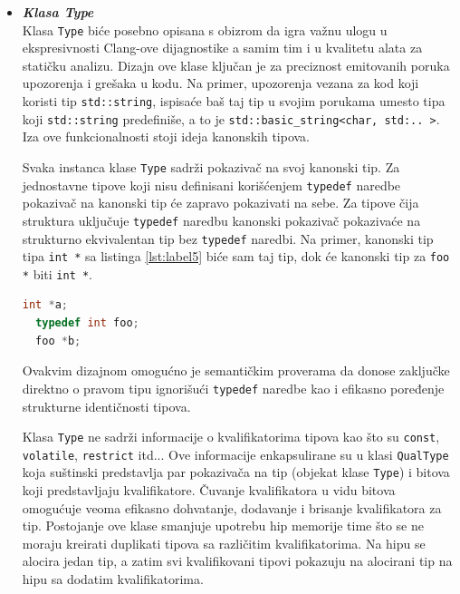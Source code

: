 \documentclass[12pt,oneside]{memoir}
\begin{document}
\begin{itemize}
  \item \textit{\textbf{Klasa Type}} \\ Klasa \lstinline{Type} bi\'{c}e posebno opisana s obizrom da igra va\v{z}nu ulogu u ekspresivnosti Clang-ove dijagnostike a samim tim i u kvalitetu alata za stati\v{c}ku analizu. Dizajn ove klase klju\v{c}an je za preciznost emitovanih poruka upozorenja i gre\v{s}aka u kodu. Na primer, upozorenja vezana za kod koji koristi tip \lstinline{std::string}, ispisa\'{c}e ba\v{s} taj tip u svojim porukama umesto tipa koji \lstinline{std::string} predefini\v{s}e, a to je \lstinline{std::basic_string<char, std:.. >}. Iza ove funkcionalnosti stoji ideja kanonskih tipova.
  
  \par
  Svaka instanca klase \lstinline{Type} sadr\v{z}i pokaziva\v{c} na svoj kanonski tip. Za jednostavne tipove koji nisu definisani kori\v{s}\'{c}enjem \lstinline{typedef} naredbe pokaziva\v{c} na kanonski tip \'{c}e zapravo pokazivati na sebe. Za tipove \v{c}ija struktura uklju\v{c}uje \lstinline{typedef} naredbu kanonski pokaziva\v{c} pokaziva\'{c}e na strukturno ekvivalentan tip bez \lstinline{typedef} naredbi.
  Na primer, kanonski tip tipa \lstinline{int *} sa listinga \ref{lst:label5}  bi\'{c}e sam taj tip, dok \'{c}e kanonski tip za \lstinline{foo *} biti \lstinline{int *}.

\begin{lstlisting}[caption={Demonstracija kanonskih tipova},label=lst:label5,language=C++, captionpos=b]
  int *a;
  typedef int foo;
  foo *b;
\end{lstlisting}
  Ovakvim dizajnom omogu\'{c}no je semanti\v{c}kim proverama da donose zaklju\v{c}ke direktno o pravom tipu ignori\v{s}u\'{c}i \lstinline{typedef} naredbe kao i efikasno poređenje strukturne identi\v{c}nosti tipova.

  \par
  Klasa \lstinline{Type} ne sadr\v{z}i informacije o kvalifikatorima tipova kao \v{s}to su \lstinline{const}, \lstinline{volatile}, \lstinline{restrict} itd... Ove informacije enkapsulirane su u klasi \lstinline{QualType} koja su\v{s}tinski predstavlja par pokaziva\v{c}a na tip (objekat klase \lstinline{Type}) i bitova koji predstavljaju
  kvalifikatore. \v{C}uvanje kvalifikatora u vidu bitova omogu\'{c}uje veoma efikasno dohvatanje, dodavanje i brisanje kvalifikatora za tip. Postojanje ove klase smanjuje upotrebu hip memorije time \v{s}to se ne moraju kreirati duplikati tipova sa razli\v{c}itim kvalifikatorima. Na hipu se alocira jedan tip, a zatim 
  svi kvalifikovani tipovi pokazuju na alocirani tip na hipu sa dodatim kvalifikatorima.
\end{itemize}
\end{document}
